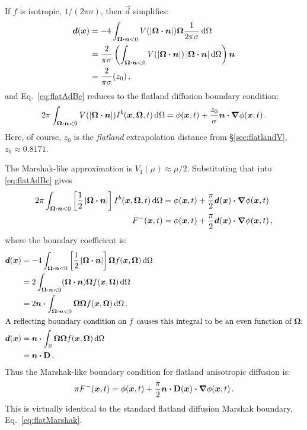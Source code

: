 If $f$ is isotropic, $1/(2\pi\sigma)$, then $\vec{d}$ simplifies:
\begin{align*}
  \bm{d}(\bm{x}) &= -4\int_{\bm{\Omega}\bm{\cdot}\bm{n} < 0}
  V(\left| \bm{\Omega}\bm{\cdot}\bm{n} \right|)
  \bm{\Omega} \frac{1}{2\pi\sigma} \mathop{}\!\mathrm{d}\Omega
\\
&= \frac{2}{\pi\sigma} \left( \int_{\bm{\Omega}\bm{\cdot}\bm{n} < 0}
  V(\left| \bm{\Omega}\bm{\cdot}\bm{n} \right|)
  \left| \bm{\Omega}\bm{\cdot}\bm{n} \right|\mathop{}\!\mathrm{d}\Omega\right) \bm{n}
\\
&= \frac{2}{\pi\sigma} (z_0) \,,
\end{align*}
and Eq.~\eqref{eq:flatAdBc} reduces to the flatland diffusion boundary
condition:
\begin{equation*}
2\pi \int_{\bm{\Omega}\bm{\cdot}\bm{n} < 0} V( \left| \bm{\Omega}\bm{\cdot}\bm{n} \right|)
I^b(\bm{x}, \bm{\Omega},t) \mathop{}\!\mathrm{d}\Omega
=
\phi(\bm{x},t)
+ \frac{z_0}{\sigma} \bm{n} \bm{\cdot} \bm{\nabla} \phi(\bm{x},t)\,.
\end{equation*}
Here, of course, $z_0$ is the \emph{flatland} extrapolation distance from
\S\ref{sec:flatlandV}, $z_0\approx 0.8171$.

\thesisclearpage

The Marshak-like approximation is $V_1(\mu) \approx \mu/2$. Substituting that
into \eqref{eq:flatAdBc} gives
\begin{align*}
  2\pi \int_{\bm{\Omega}\bm{\cdot}\bm{n} < 0} \left[
    \frac{1}{2} \left| \bm{\Omega}\bm{\cdot}\bm{n} \right| \right]
I^b(\bm{x}, \bm{\Omega},t) \mathop{}\!\mathrm{d}\Omega
&=
\phi(\bm{x},t)
+ \frac{\pi}{2} \bm{d}(\bm{x}) \bm{\cdot} \bm{\nabla} \phi(\bm{x},t)
\\
F^-(\bm{x},t) 
&=
\phi(\bm{x},t)
+ \frac{\pi}{2} \bm{d}(\bm{x}) \bm{\cdot} \bm{\nabla} \phi(\bm{x},t) \,,
\end{align*}
where the boundary coefficient is:
\begin{align*}
  \bm{d}(\bm{x}) &= -4\int_{\bm{\Omega}\bm{\cdot}\bm{n} < 0}
  \left[ \frac{1}{2} \left| \bm{\Omega}\bm{\cdot}\bm{n} \right| \right]
  \bm{\Omega} f(\bm{x},\bm{\Omega}) \mathop{}\!\mathrm{d}\Omega
  \\
  &= 2 \int_{\bm{\Omega}\bm{\cdot}\bm{n} < 0} (\bm{\Omega}\bm{\cdot}\bm{n})
  \bm{\Omega} f(\bm{x},\bm{\Omega}) \mathop{}\!\mathrm{d}\Omega
  \\
  &=2 \bm{n} \bm{\cdot} \int_{\bm{\Omega}\bm{\cdot}\bm{n} < 0} \bm{\Omega}
  \bm{\Omega} f(\bm{x},\bm{\Omega}) \mathop{}\!\mathrm{d}\Omega \,.
  \\ 
  \intertext{A reflecting boundary condition on $f$ causes this integral to
    be an even function of $\bm{\Omega}$:}
  \bm{d}(\bm{x})
  &= \bm{n} \bm{\cdot} \int_{S}\bm{\Omega} \bm{\Omega}
  f(\bm{x},\bm{\Omega}) \mathop{}\!\mathrm{d}\Omega
  \\
  &= \bm{n} \bm{\cdot} \mathbf{D} \,.
\end{align*}
Thus the Marshak-like boundary condition for flatland anisotropic diffusion is:
\begin{equation}\label{eq:flatMarshakAdBc}
\pi F^-(\bm{x},t) 
=
\phi(\bm{x},t)
+ \frac{\pi}{2}\bm{n} \bm{\cdot} \mathbf{D}(\bm{x}) \bm{\cdot} \bm{\nabla} \phi(\bm{x},t) \,.
\end{equation}
This is virtually identical to the standard flatland diffusion Marshak boundary,
Eq.~\eqref{eq:flatMarshak}.


